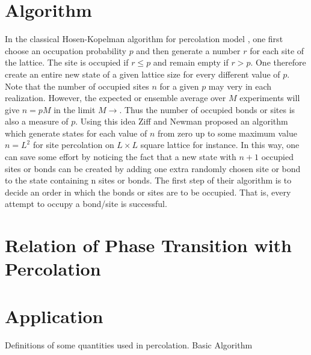 \section{Algorithm} \label{sect:algorithm}
In the classical Hosen-Kopelman algorithm for percolation model \cite{Hoshen1976}, one first choose an occupation probability $p$ and then generate a number $r$ for each site of the lattice. The site is occupied if $r \leq p$ and remain empty if $r > p$. One therefore create an entire new state of a given lattice size for every different value of $p$. Note that the number of occupied sites $n$ for a given $p$ may very in each realization. However, the expected or ensemble average over $M$ experiments will give $n = p M$ in the limit $M \rightarrow$. Thus the number of occupied bonds or sites is also a measure of $p$. Using this idea Ziff and Newman \cite{Newman2001} proposed an algorithm which generate states for each value of $n$ from zero up to some maximum value $n = L^2$ for site percolation on $L\times L$ square lattice for instance. In this way, one can save some effort by noticing the fact that a new state with $n + 1$ occupied sites or bonds can be created by adding one extra randomly chosen site or bond to the state containing n sites or bonds. The first step of their algorithm is to decide an order in which the bonds or sites are to be occupied. That is, every attempt to occupy a bond/site is successful.

\section{Relation of Phase Transition with Percolation}

\section{Application}\label{sect:application}
	
Definitions of some quantities used in percolation.
Basic Algorithm

